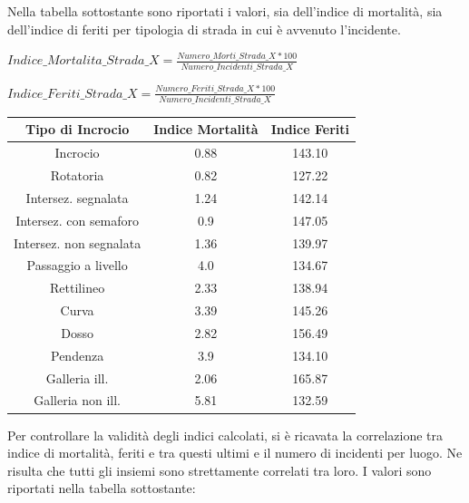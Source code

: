\documentclass[a4paper]{report}
\begin{document}
Nella tabella sottostante sono riportati i valori, sia dell'indice di mortalità, sia dell'indice di 
feriti per tipologia di strada in cui è avvenuto l'incidente.

\begin{center}
    $Indice\_Mortalita\_Strada\_X = \displaystyle \frac{Numero\_Morti\_Strada\_X * 100}{Numero\_Incidenti\_Strada\_X}$ 
\end{center}

\begin{center}
    $Indice\_Feriti\_Strada\_X = \displaystyle \frac{Numero\_Feriti\_Strada\_X * 100}{Numero\_Incidenti\_Strada\_X}$ 
\end{center}

\begin{center}
    \def\arraystretch{1.5}%
    \begin{tabular}{ |c|c|c| } 
    \hline
    Tipo di Incrocio & Indice Mortalità & Indice Feriti \\ 
    \hline
    \rowcolor{TableGray}
    Incrocio                & 0.88 & 143.10 \\
    Rotatoria               & 0.82 & 127.22 \\
    \rowcolor{TableGray}
    Intersez. segnalata     & 1.24 & 142.14 \\
    Intersez. con semaforo  & 0.9 & 147.05 \\
    \rowcolor{TableGray}
    Intersez. non segnalata & 1.36 & 139.97\\
    Passaggio a livello     & 4.0 & 134.67\\
    \rowcolor{TableGray}
    Rettilineo              & 2.33 & 138.94\\
    Curva                   & 3.39 & 145.26\\
    \rowcolor{TableGray}
    Dosso                   & 2.82 & 156.49\\
    Pendenza                & 3.9 & 134.10\\
    \rowcolor{TableGray}
    Galleria ill.           & 2.06 & 165.87\\
    Galleria non ill.       & 5.81 & 132.59\\
    \hline
    \end{tabular}
\end{center}

Per controllare la validità degli indici calcolati, si è ricavata la correlazione tra indice di 
mortalità, feriti e tra questi ultimi e il numero di incidenti per luogo.
Ne risulta che tutti gli insiemi sono strettamente correlati tra loro. 
I valori sono riportati nella tabella sottostante: 
\end{document}
